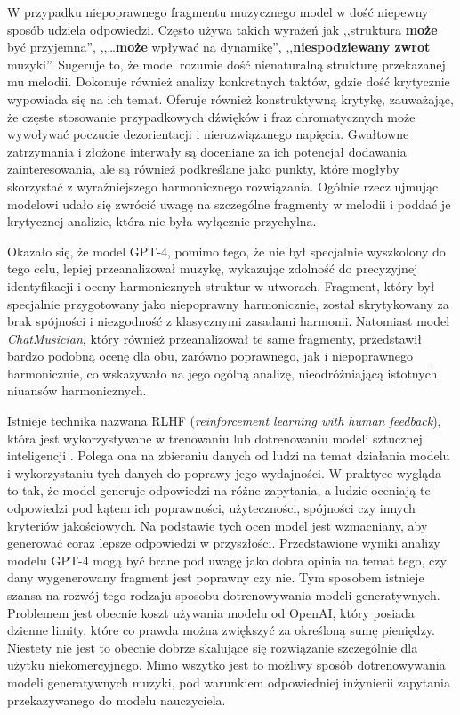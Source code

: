 \documentclass[data-science]{agh-wi} %
\begin{document}
W przypadku niepoprawnego fragmentu muzycznego model w dość niepewny sposób udziela odpowiedzi. Często używa takich wyrażeń jak ,,struktura \textbf{może} być przyjemna'', ,,\dots \textbf{może} wpływać na dynamikę'', ,,\textbf{niespodziewany zwrot} muzyki''. Sugeruje to, że model rozumie dość nienaturalną strukturę przekazanej mu melodii. Dokonuje również analizy konkretnych taktów, gdzie dość krytycznie wypowiada się na ich temat. Oferuje również konstruktywną krytykę, zauważając, że częste stosowanie przypadkowych dźwięków i fraz chromatycznych może wywoływać poczucie dezorientacji i nierozwiązanego napięcia. Gwałtowne zatrzymania i złożone interwały są doceniane za ich potencjał dodawania zainteresowania, ale są również podkreślane jako punkty, które mogłyby skorzystać z wyraźniejszego harmonicznego rozwiązania. Ogólnie rzecz ujmując modelowi udało się zwrócić uwagę na szczególne fragmenty w melodii i poddać je krytycznej analizie, która nie była wyłącznie przychylna.

Okazało się, że model GPT-4, pomimo tego, że nie był specjalnie wyszkolony do tego celu, lepiej przeanalizował muzykę, wykazując zdolność do precyzyjnej identyfikacji i oceny harmonicznych struktur w utworach. Fragment, który był specjalnie przygotowany jako niepoprawny harmonicznie, został skrytykowany za brak spójności i niezgodność z klasycznymi zasadami harmonii. Natomiast model \textit{ChatMusician}, który również przeanalizował te same fragmenty, przedstawił bardzo podobną ocenę dla obu, zarówno poprawnego, jak i niepoprawnego harmonicznie, co wskazywało na jego ogólną analizę, nieodróżniającą istotnych niuansów harmonicznych.

Istnieje technika nazwana RLHF (\textit{reinforcement learning with human feedback}), która jest wykorzystywane w trenowaniu lub dotrenowaniu modeli sztucznej inteligencji \cite{rl_training}. Polega ona na zbieraniu danych od ludzi na temat działania modelu i wykorzystaniu tych danych do poprawy jego wydajności. W praktyce wygląda to tak, że model generuje odpowiedzi na różne zapytania, a ludzie oceniają te odpowiedzi pod kątem ich poprawności, użyteczności, spójności czy innych kryteriów jakościowych. Na podstawie tych ocen model jest wzmacniany, aby generować coraz lepsze odpowiedzi w przyszłości. Przedstawione wyniki analizy modelu GPT-4 mogą być brane pod uwagę jako dobra opinia na temat tego, czy dany wygenerowany fragment jest poprawny czy nie. Tym sposobem istnieje szansa na rozwój tego rodzaju sposobu dotrenowywania modeli generatywnych. Problemem jest obecnie koszt używania modelu od OpenAI, który posiada dzienne limity, które co prawda można zwiększyć za określoną sumę pieniędzy. Niestety nie jest to obecnie dobrze skalujące się rozwiązanie szczególnie dla użytku niekomercyjnego. Mimo wszytko jest to możliwy sposób dotrenowywania modeli generatywnych muzyki, pod warunkiem odpowiedniej inżynierii zapytania przekazywanego do modelu nauczyciela.
\end{document}
